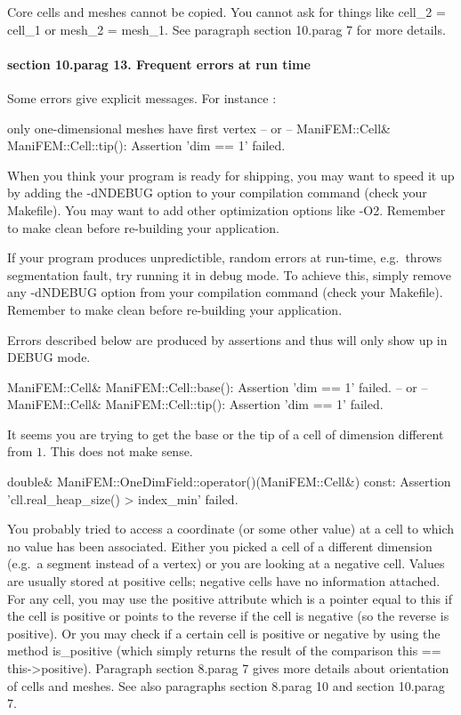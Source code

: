 Core cells and meshes cannot be copied.
You cannot ask for things like {\codett cell\_2 = cell\_1} or {\codett mesh\_2 =
mesh\_1}.
See paragraph \numb section 10.\numb parag 7 for more details.


\paragraph{\numb section 10.\numb parag 13. Frequent errors at run time}

Some errors give explicit messages. For instance :

\verbatim
only one-dimensional meshes have first vertex
-- or --
ManiFEM::Cell& ManiFEM::Cell::tip(): Assertion 'dim == 1' failed.
\endverbatim
\smallskip

When you think your program is ready for shipping, you may want to speed it up
by adding the {\codett -dNDEBUG} option to your compilation command
(check your {\codett Makefile}).
You may want to add other optimization options like {\codett -O2}.
Remember to {\codett make clean} before re-building your application.

If your program produces unpredictible, random errors at run-time, e.g.\ throws
{\codett segmentation fault}, try running it in debug mode.
To achieve this, simply remove any {\codett -dNDEBUG} option from your compilation
command (check your {\codett Makefile}).
Remember to {\codett make clean} before re-building your application.

Errors described below are produced by {\codett assert}ions and thus will
only show up in {\codett DEBUG} mode.

\smallskip\verbatim
ManiFEM::Cell& ManiFEM::Cell::base(): Assertion 'dim == 1' failed.
-- or --
ManiFEM::Cell& ManiFEM::Cell::tip(): Assertion 'dim == 1' failed.
\endverbatim

It seems you are trying to get the base or the tip of a cell of dimension
different from $1$.
This does not make sense.

\medskip\verbatim
double& ManiFEM::OneDimField::operator()(ManiFEM::Cell&) const:
Assertion 'cll.real_heap_size() > index_min' failed.
\endverbatim

You probably tried to access a coordinate (or some other value) at a cell to which 
no value has been associated.
Either you picked a cell of a different dimension (e.g.\ a segment instead of a
vertex) or you are looking at a negative cell.
Values are usually stored at positive cells; negative cells have no information attached.
For any cell, you may use the {\codett positive} attribute which is a pointer
equal to {\codett this} if the cell is positive or points to the reverse if
the cell is negative (so the reverse is positive).
Or you may check if a certain cell is positive or negative by using the method
{\codett is\_positive} (which simply returns the result of the comparison {\codett
this == this->positive}).
Paragraph \numb section 8.\numb parag 7 gives more details about orientation of
cells and meshes.
See also paragraphs \numb section 8.\numb parag 10 and \numb section 10.\numb parag 7.

